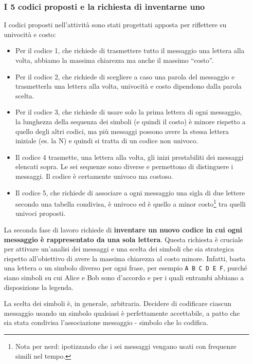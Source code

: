 \subsubsection{I 5 codici proposti e la richiesta di inventarne uno }\label{i-5-codici-proposti-e-la-richiesta-di-inventarne-uno}

I codici proposti nell'attività sono stati progettati apposta per riflettere su univocità e costo:

\begin{itemize}
\item
  Per il codice 1, che richiede di trasmettere tutto il messaggio una lettera alla volta, abbiamo la massima chiarezza ma anche il massimo ``costo''.
\item
  Per il codice 2, che richiede di scegliere a caso una parola del messaggio e trasmetterla una lettera alla volta, univocità e costo dipendono dalla parola scelta.
\item
  Per il codice 3, che richiede di usare solo la prima lettera di ogni messaggio, la lunghezza della sequenza dei simboli (e quindi il costo) è minore rispetto a quello degli altri codici, ma più messaggi possono avere la stessa lettera iniziale (es. la N) e quindi si tratta di un codice non univoco.
\item
Il codice 4 trasmette, una lettera alla volta, gli inizi prestabiliti dei messaggi elencati sopra. Le sei sequenze sono diverse e permettono di distinguere i messaggi. Il codice è certamente univoco ma costoso.
\item
  Il codice 5, che richiede di associare a ogni messaggio una sigla di due lettere secondo una tabella condivisa, è univoco ed è quello a minor costo\footnote{Nota per nerd: ipotizzando che i sei messaggi vengano usati con frequenze simili nel tempo.} tra quelli univoci proposti.
\end{itemize}

La seconda fase di lavoro richiede di \textbf{inventare un nuovo codice in cui ogni messaggio è rappresentato da una sola lettera}. Questa richiesta è cruciale per attivare un'analisi dei messaggi e una scelta dei simboli che sia strategica rispetto all'obiettivo di avere la massima chiarezza al costo minore. Infatti, basta una lettera o un simbolo diverso per ogni frase, per esempio \texttt{A B C D E F}, purché siano simboli su cui Alice e Bob sono d'accordo e per i quali entrambi abbiano a disposizione la legenda.

\begin{attenzione}\label{aspetto-a-cui-fare-attenzione-2}


La scelta dei simboli è, in generale, arbitraria. Decidere di codificare ciascun messaggio usando un simbolo qualsiasi è perfettamente accettabile, a patto che sia stata condivisa l'associazione messaggio - simbolo che lo codifica.
\end{attenzione}


